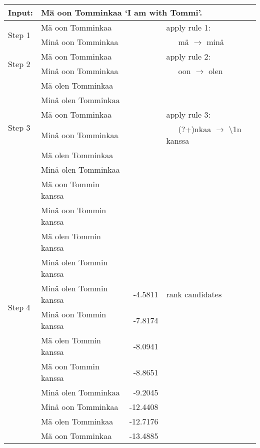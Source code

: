 \documentclass[11pt]{article}
\begin{document}
\begin{table*}
  \centering
  \begin{tabular}{|l|l|r|l|}
    \hline
    \textbf{Input:} & \multicolumn{3}{l|}{M\"{a} oon Tomminkaa `I am with Tommi'.} \\
    \hline
    \multirow{2}{*}{Step 1}  & M\"{a} oon Tomminkaa & & apply rule 1: \\
                             & Min\"{a} oon Tomminkaa & & ~~~m\"{a} $\rightarrow$ min\"{a} \\
    \hline
    \multirow{2}{*}{Step 2}  & M\"{a} oon Tomminkaa & & apply rule 2: \\
                             & Min\"{a} oon Tomminkaa & & ~~~oon $\rightarrow$ olen \\
                             & M\"{a} olen Tomminkaa & & \\
                             & Min\"{a} olen Tomminkaa & & \\
    \hline
    \multirow{2}{*}{Step 3}  & M\"{a} oon Tomminkaa   & & apply rule 3:\\
                             & Min\"{a} oon Tomminkaa &  & ~~~(?+)nkaa $\rightarrow$ \textbackslash1n kanssa \\
                             & M\"{a} olen Tomminkaa  & &\\
                             & Min\"{a} olen Tomminkaa  & &\\
                             & M\"{a} oon Tommin kanssa  & &\\
                             & Min\"{a} oon Tommin kanssa  & &\\
                             & M\"{a} olen Tommin kanssa  & &\\
                             & Min\"{a} olen Tommin kanssa  & &\\
    \hline
    \multirow{2}{*}{Step 4} &  Min\"{a} olen Tommin kanssa & -4.5811 & rank candidates \\
                            &  Min\"{a} oon Tommin kanssa & -7.8174 & \\
                            &  M\"{a} olen Tommin kanssa & -8.0941 & \\
                            &  M\"{a} oon Tommin kanssa & -8.8651 & \\
                            &  Min\"{a} olen Tomminkaa & -9.2045 & \\
                            &  Min\"{a} oon Tomminkaa & -12.4408 & \\
                            &  M\"{a} olen Tomminkaa & -12.7176 & \\
                            &  M\"{a} oon Tomminkaa & -13.4885 & \\


\end{tabular}
\end{table*}
\end{document}
